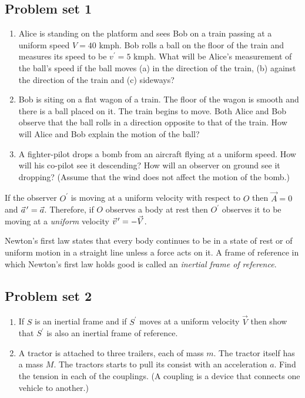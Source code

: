 \subsection{Problem set 1}\label{c1s1s1}
\begin{enumerate}
\item Alice is standing on the platform and sees Bob on a train passing at a
uniform speed $V = 40$ kmph. Bob rolls a ball on the floor of the train and
measures its speed to be $v^\prime = 5$ kmph. What will be Alice's measurement
of the ball's speed if the ball moves (a) in the direction of the train, 
(b) against the direction of the train and (c) sideways?
\item Bob is siting on a flat wagon of a train. The floor of the wagon is 
smooth and there is a ball placed on it. The train begins to move. Both Alice
and Bob observe that the ball rolls in a direction opposite to that of the 
train. How will Alice and Bob explain the motion of the ball?
\item A fighter-pilot drops a bomb from an aircraft flying at a uniform speed. 
How will his co-pilot see it descending? How will an observer on ground see it
dropping? (Assume that the wind does not affect the motion of the bomb.)
\end{enumerate}

If the observer $O^\prime$ is moving at a uniform velocity with respect to $O$
then $\vec{A} = 0$ and $\pvec{a}^\prime = \vec{a}$. Therefore, if $O$ observes
a body at rest then $O^\prime$ observes it to be moving at a \emph{uniform}
velocity $\pvec{v}^\prime = -\vec{V}$.

Newton's first law states that every body continues to be in a state of rest
or of uniform motion in a straight line unless a force acts on it. A frame of
reference in which Newton's first law holds good is called an \emph{inertial
frame of reference}. 

\subsection{Problem set 2}\label{c1s1s2}
\begin{enumerate}
\item If $S$ is an inertial frame and if $S^\prime$ moves at a uniform velocity
$\vec{V}$ then show that $S^\prime$ is also an inertial frame of reference.
\item A tractor is attached to three trailers, each of mass $m$. The tractor 
itself has a mass $M$. The tractors starts to pull its consist with an 
acceleration $a$. Find the tension in each of the couplings. (A coupling is a 
device that connects one vehicle to another.)
\end{enumerate}

